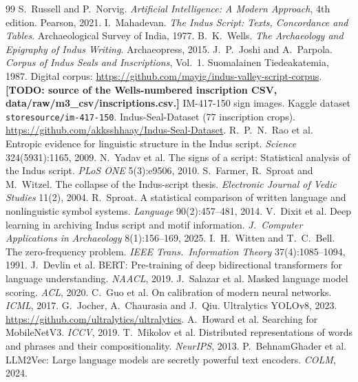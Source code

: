 \documentclass[11pt,a4paper,twocolumn]{article}
\begin{document}
\begin{thebibliography}{99}
\small
{}
S.~Russell and P.~Norvig.
\newblock \emph{Artificial Intelligence: A Modern Approach}, 4th edition.
\newblock Pearson, 2021.
 I.~Mahadevan. \emph{The Indus Script: Texts, Concordance and Tables}. Archaeological Survey of India, 1977.
 B.~K.~Wells. \emph{The Archaeology and Epigraphy of Indus Writing}. Archaeopress, 2015.
 J.~P.~Joshi and A.~Parpola. \emph{Corpus of Indus Seals and Inscriptions}, Vol.~1. Suomalainen Tiedeakatemia, 1987. Digital corpus: \url{https://github.com/mayig/indus-valley-script-corpus}.
 \textbf{[TODO: source of the Wells-numbered inscription CSV, data/raw/m3\_csv/inscriptions.csv.]}
 IM-417-150 sign images. Kaggle dataset \texttt{storesource/im-417-150}.
 Indus-Seal-Dataset (77 inscription crops). \url{https://github.com/akksshhaay/Indus-Seal-Dataset}.
 R.~P.~N.~Rao et al. Entropic evidence for linguistic structure in the Indus script. \emph{Science} 324(5931):1165, 2009.
 N.~Yadav et al. The signs of a script: Statistical analysis of the Indus script. \emph{PLoS ONE} 5(3):e9506, 2010.
 S.~Farmer, R.~Sproat and M.~Witzel. The collapse of the Indus-script thesis. \emph{Electronic Journal of Vedic Studies} 11(2), 2004.
 R.~Sproat. A statistical comparison of written language and nonlinguistic symbol systems. \emph{Language} 90(2):457--481, 2014.
 V.~Dixit et al. Deep learning in archiving Indus script and motif information. \emph{J.\ Computer Applications in Archaeology} 8(1):156--169, 2025.
 I.~H.~Witten and T.~C.~Bell. The zero-frequency problem. \emph{IEEE Trans.\ Information Theory} 37(4):1085--1094, 1991.
 J.~Devlin et al. BERT: Pre-training of deep bidirectional transformers for language understanding. \emph{NAACL}, 2019.
 J.~Salazar et al. Masked language model scoring. \emph{ACL}, 2020.
 C.~Guo et al. On calibration of modern neural networks. \emph{ICML}, 2017.
 G.~Jocher, A.~Chaurasia and J.~Qiu. Ultralytics YOLOv8, 2023. \url{https://github.com/ultralytics/ultralytics}.
 A.~Howard et al. Searching for MobileNetV3. \emph{ICCV}, 2019.
 T.~Mikolov et al. Distributed representations of words and phrases and their compositionality. \emph{NeurIPS}, 2013.
 P.~BehnamGhader et al. LLM2Vec: Large language models are secretly powerful text encoders. \emph{COLM}, 2024.
\end{thebibliography}
\end{document}
